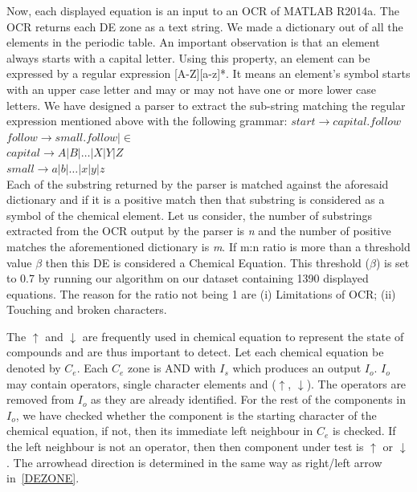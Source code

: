 \documentclass[conference]{IEEEtran}
\begin{document}
Now, each displayed equation is an input to an OCR of MATLAB
R2014a. The OCR returns each DE zone as a text string. We made a
dictionary out of all the elements in the periodic table. An
important observation is that an element always starts with a
capital letter. Using this property, an element can be expressed
by a regular expression [A-Z][a-z]*. It means an element's
symbol starts with an upper case letter and may or may not have
one or more lower case letters. We have designed a parser to extract the
sub-string matching the regular expression mentioned above with
the following grammar: %
\small{
 $start \rightarrow capital.follow$\\ $follow \rightarrow small.follow | \in$\\
$capital \rightarrow A|B| \dots |X|Y|Z$\\  $small \rightarrow
a|b| \dots |x|y|z$\\ }
Each of the substring returned
by the parser is matched against the aforesaid dictionary and if
it is a positive match then that substring is considered as a
symbol of the chemical element. Let us consider, the number of
substrings extracted from the OCR output by the parser is {\em
n} and the number of positive matches the aforementioned
dictionary is {\em m}. If m:n ratio is more than a threshold
value $\beta$ then this DE is considered a Chemical Equation.
This threshold ($\beta$) is set to 0.7 by running our algorithm
on our dataset containing 1390 displayed equations. The reason
for the ratio not being 1 are (i) Limitations of OCR; (ii)
Touching and broken characters.

The $\uparrow$ and $\downarrow$ are frequently used in chemical equation to represent the state of compounds and  are thus important to detect.
Let each chemical equation be denoted by $C_e$. Each $C_e$ zone is AND with $I_s$ which produces an output $I_o$. $I_o$ may contain  operators, single character elements and ($\uparrow$, $\downarrow$). The operators are removed from $I_o$ as they are already identified. For the rest of the components in $I_o$, we have checked whether the component is the starting character of the chemical equation, if not, then its immediate left neighbour in $C_e$ is checked. If the left neighbour is not an operator, then then component under test is  $\uparrow$ or $\downarrow$. The arrowhead direction is determined in the same way as right/left arrow in~\ref{DEZONE}.
\end{document}
